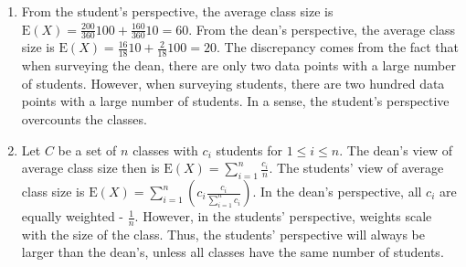 \begin{enumerate}[label=(\alph*)]
\item From the student's perspective, the average class size is $\text{E}(X)
=
\frac{200}{360}100 + \frac{160}{360}10 = 60$. From the dean's perspective, the
average class size is $\text{E}(X) = \frac{16}{18}10 + \frac{2}{18}100 =
20$. The discrepancy comes from the fact that when surveying the dean, there are
only two data points with a large number of students. However, when surveying
students, there are two hundred data points with a large number of students.
In a sense, the student's perspective overcounts the classes.

\item Let $C$ be a set of $n$ classes with $c_{i}$ students for $1 \leq i \leq
n$. The dean's view of average class size then is $\text{E}(X) = \sum_{i=1}^
{n}\frac{c_{i}}{n}$. The students' view of average class size is $\text{E}
(X) = \sum_{i=1}^{n}(c_{i}\frac{c_{i}}{\sum_{i=1}^{n}c_{i}})$. In the dean's
perspective, all $c_{i}$ are equally weighted - $\frac{1}{n}$. However, in the
students' perspective, weights scale with the size of the class. Thus, the
students' perspective will always be larger than the dean's, unless all classes
have the same number of students.
\end{enumerate}